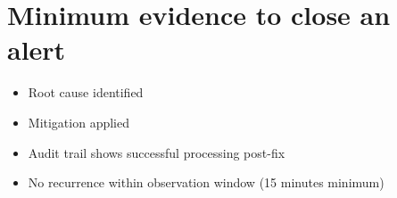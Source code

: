 \section{Minimum evidence to close an alert}

\begin{itemize}
  \item Root cause identified
  \item Mitigation applied
  \item Audit trail shows successful processing post-fix
  \item No recurrence within observation window (15 minutes minimum)
\end{itemize}